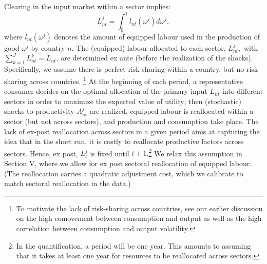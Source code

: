 \documentclass[12pt]{article}
\begin{document}
Clearing in the input market within a sector implies: 
\begin{equation*}
L_{nt}^{j}=\int_{0}^{1}l_{nt}(\omega ^{j})d\omega ^{j},
\end{equation*}%
where $l_{nt}(\omega ^{j})$ denotes the amount of equipped labour used in
the production of good $\omega ^{j}$ by country $n$. The (equipped) labour
allocated to each sector, $L_{nt}^{j},$ with $\sum%
\nolimits_{k=1}^{J}L_{nt}^{k}=L_{nt}$, are determined ex ante (before the
realization of the shocks). Specifically, we assume there is perfect
risk-sharing within a country, but no risk-sharing across countries.%
\footnote{%
To motivate the lack of risk-sharing across countries, see our earlier
discussion on the high comovement between consumption and output as well as
the high correlation between consumption and output volatility.} At the
beginning of each period, a representative consumer decides on the optimal
allocation of the primary input $L_{nt}$ into different sectors in order to
maximize the expected value of utility; then (stochastic) shocks to
productivity $A_{nt}^{j}$ are realized, equipped labour is reallocated
within a sector (but not across sectors), and production and consumption
take place. The lack of ex-post reallocation across sectors in a given
period aims at capturing the idea that in the short run, it is costly to
reallocate productive factors across sectors. Hence, ex post, $L_{t}^{j}$ is
fixed until $t+1.$\footnote{%
In the quantification, a period will be one year. This amounts to assuming
that it takes at least one year for resources to be reallocated across
sectors.} We relax this assumption in Section V, where we allow for ex post
sectoral reallocation of equipped labour. (The reallocation carries a
quadratic adjustment cost, which we calibrate to match sectoral reallocation
in the data.)
\end{document}

